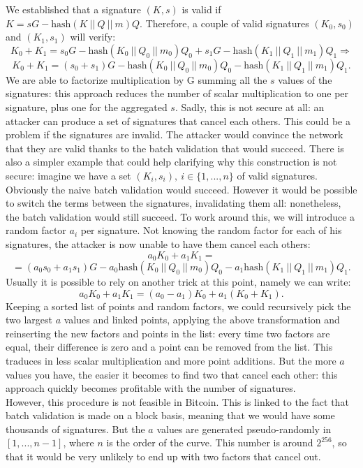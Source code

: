 \bigskip
\noindent
We established that a signature $(K, s)$ is valid if $K = sG - \text{hash}(K \ || \ Q \ || \ m)Q$. 
Therefore, a couple of valid signatures $(K_0, s_0)$ and $(K_1, s_1)$ will verify:
$$K_0 + K_1 = s_0G - \text{hash}(K_0 \ || \ Q_0 \ || \ m_0)Q_0 + s_1G - \text{hash}(K_1 \ || \ Q_1 \ || \ m_1)Q_1 \Longrightarrow
$$
$$K_0 + K_1 = (s_0 + s_1)G - \text{hash}(K_0 \ || \ Q_0 \ || \ m_0)Q_0 - \text{hash}(K_1 \ || \ Q_1 \ || \ m_1)Q_1.$$
We are able to factorize multiplication by G summing all the $s$ values of the signatures: this approach reduces the number of scalar multiplication to one per signature, plus one for the aggregated $s$. Sadly, this is not secure at all: an attacker can produce a set of signatures that cancel each others. This could be a problem if the signatures are invalid. The attacker would convince the network that they are valid thanks to the batch validation that would succeed. There is also a simpler example that could help clarifying why this construction is not secure: imagine we have a set $(K_i, s_i), \ i \in \{1, ..., n\}$ of valid signatures. Obviously the naive batch validation would succeed. However it would be possible to switch the terms between the signatures, invalidating them all: nonetheless, the batch validation would still succeed. To work around this, we will introduce a random factor $a_i$ per signature. Not knowing the random factor for each of his signatures, the attacker is now unable to have them cancel each others:
$$a_0K_0 + a_1K_1 = $$
$$= (a_0s_0 + a_1s_1)G - a_0\text{hash}(K_0 \ || \ Q_0 \ || \ m_0)Q_0 - a_1\text{hash}(K_1 \ || \ Q_1 \ || \ m_1)Q_1.$$
Usually it is possible to rely on another trick at this point, namely we can write:
$$a_0K_0 + a_1K_1 = (a_0 - a_1)K_0 + a_1(K_0 + K_1).$$
Keeping a sorted list of points and random factors, we could recursively pick the two largest $a$ values and linked points, applying the above transformation and reinserting the new factors and points in the list: every time two factors are equal, their difference is zero and a point can be removed from the list. This traduces in less scalar multiplication and more point additions. But the more $a$ values you have, the easier it becomes to find two that cancel each other: this approach quickly becomes profitable with the number of signatures.
\\
However, this procedure is not feasible in Bitcoin. This is linked to the fact that batch validation is made on a block basis, meaning that we would have some thousands of signatures. But the $a$ values are generated pseudo-randomly in $[1, ..., n - 1]$, where $n$ is the order of the curve. This number is around $2^{256}$, so that it would be very unlikely to end up with two factors that cancel out.

